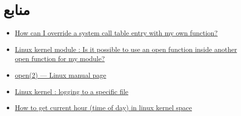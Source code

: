 \documentclass[13pt]{article}
\begin{document}
  	\section{منابع}
  	\begin{latin}
  		\begin{itemize}
  			\item 
  			\href{https://stackoverflow.com/questions/59812156/how-can-i-override-a-system-call-table-entry-with-my-own-function}{How can I override a system call table entry with my own function?} 
  			\item
  			\href{https://stackoverflow.com/questions/58560284/linux-kernel-module-is-it-possible-to-use-an-open-function-inside-another-open}{Linux kernel module : Is it possible to use an open function inside another open function for my module?}
  			\item 
  			\href{https://man7.org/linux/man-pages/man2/open.2.html}{open(2) — Linux manual page}
  			\item 
  			\href{https://stackoverflow.com/questions/25719930/linux-kernel-logging-to-a-specific-file}{Linux kernel : logging to a specific file}
  			\item 
  			\href{https://stackoverflow.com/questions/5077192/how-to-get-current-hour-time-of-day-in-linux-kernel-space}{How to get current hour (time of day) in linux kernel space}
  	\end{itemize}
  	\end{latin}
  	
      
\end{document}
